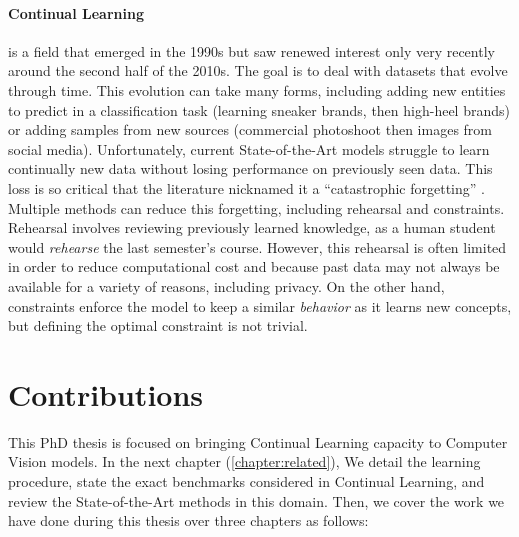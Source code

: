 \paragraph{Continual Learning} is a field that emerged in the 1990s but saw renewed interest only
very recently around the second half of the 2010s. The goal is to deal with datasets that evolve
through time. This evolution can take many forms, including adding new entities to predict in a
classification task (\eg learning sneaker brands, then high-heel brands) or adding samples from new
sources (\eg commercial photoshoot then images from social media). Unfortunately, current
State-of-the-Art models struggle to learn continually new data without losing performance on
previously seen data. This loss is so critical that the literature nicknamed it a ``catastrophic
forgetting'' \citep{robins1995catastrophicforgetting}. Multiple methods can reduce
this forgetting, including rehearsal and constraints. Rehearsal involves reviewing
previously learned knowledge, as a human student would \textit{rehearse} the last semester's course.
However, this rehearsal is often limited in order to reduce computational cost and because past data
may not always be available for a variety of reasons, including privacy. On the other hand,
constraints enforce the model to keep a similar \textit{behavior} as it learns new concepts, but
defining the optimal constraint is not trivial.

\section{Contributions}

This PhD thesis is focused on bringing Continual Learning capacity to
Computer Vision models. In the next chapter (\autoref{chapter:related}), We detail the learning
procedure, state the exact benchmarks considered in Continual Learning, and review the
State-of-the-Art methods in this domain. Then, we cover the work we have done during this thesis over
three chapters as follows:

